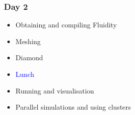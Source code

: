 
\begin{frame}
  \frametitle{Day 2}
  \begin{itemize}[]
  \item[] Obtaining and compiling Fluidity
  \item[] Meshing
  \item[] Diamond
  \item[] \textcolor{blue}{Lunch}
  \item[] Running and visualisation
  \item[] Parallel simulations and using clusters
  \end{itemize}
\end{frame}
